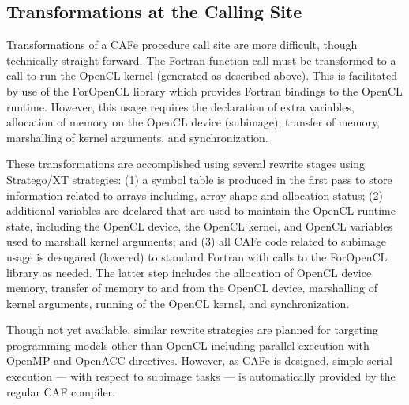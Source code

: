 \subsection{Transformations at the Calling Site}

Transformations of a CAFe procedure call site are more difficult, though technically
straight forward.  The Fortran function call must be transformed to a call to run the
OpenCL kernel (generated as described above).  This is facilitated by use of the ForOpenCL
library which provides Fortran bindings to the OpenCL
runtime\cite{Sottile:2013:FTE:2441516.2441520}.  However, this usage requires the
declaration of extra variables, allocation of memory on the OpenCL device (subimage),
transfer of memory, marshalling of kernel arguments, and synchronization.

These transformations are accomplished using several rewrite stages using Stratego/XT
strategies:
(1) a symbol table is produced in the first pass to store information related to arrays
including, array shape and allocation status;
(2) additional variables are declared that are used to maintain the OpenCL runtime state,
including the OpenCL device, the OpenCL kernel, and OpenCL variables used to marshall
kernel arguments; and
(3) all CAFe code related to subimage usage is desugared (lowered) to standard Fortran
with calls to the ForOpenCL library as needed.
The latter step includes the allocation of OpenCL device memory, transfer of memory to and
from the OpenCL device, marshalling of kernel arguments, running of the OpenCL kernel, and
synchronization.

Though not yet available, similar rewrite strategies are planned for targeting programming
models other than OpenCL including parallel execution with OpenMP and OpenACC directives.
However, as CAFe is designed, simple serial execution --- with respect to subimage tasks
--- is automatically provided by the regular CAF compiler.
